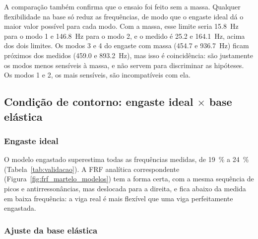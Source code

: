 A comparação também confirma que o ensaio foi feito sem a massa. Qualquer
flexibilidade na base só reduz as frequências, de modo que o engaste ideal dá o maior
valor possível para cada modo. Com a massa, esse limite seria \SI{15.8}{\hertz} para
o modo 1 e \SI{146.8}{\hertz} para o modo 2, e o medido é \num{25.2} e
\SI{164.1}{\hertz}, acima dos dois limites. Os modos 3 e 4 do engaste com massa
(\num{454.7} e \SI{936.7}{\hertz}) ficam próximos dos medidos (\num{459.0} e
\SI{893.2}{\hertz}), mas isso é coincidência: são justamente os modos menos sensíveis
à massa, e não servem para discriminar as hipóteses. Os modos 1 e 2, os mais sensíveis,
são incompatíveis com ela.

\subsection{Condição de contorno: engaste ideal \texorpdfstring{$\times$}{x} base elástica}
\label{sec:molas_res}

\subsubsection{Engaste ideal}

O modelo engastado superestima todas as frequências medidas, de \SI{19}{\percent} a
\SI{24}{\percent} (Tabela~\ref{tab:validacao}). A FRF analítica correspondente
(Figura~\ref{fig:frf_martelo_modelos}) tem a forma certa, com a mesma sequência de
picos e antirressonâncias, mas deslocada para a direita, e fica abaixo da medida em
baixa frequência: a viga real é mais flexível que uma viga perfeitamente engastada.

\subsubsection{Ajuste da base elástica}

